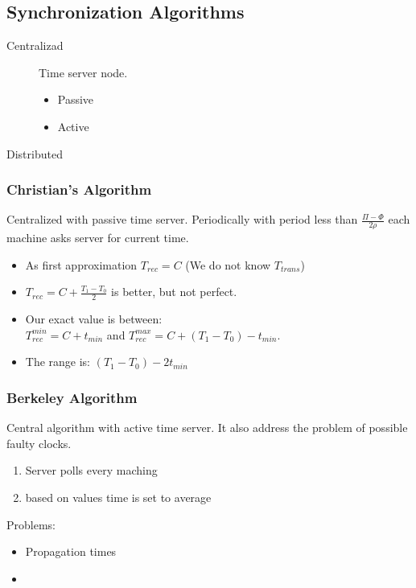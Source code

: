 \documentclass[a4paper]{article}
\begin{document}
\subsection{Synchronization Algorithms}
\begin{description}
		\item[Centralizad] Time server node.
				\begin{itemize}
						\item Passive
						\item Active
				\end{itemize}
		\item[Distributed]
\end{description}
\subsubsection{Christian's Algorithm}
Centralized with passive time server. Periodically with period less than
$\frac{\Pi - \Phi}{2\rho}$ each machine asks server for current time.
\begin{itemize}
		\item As first approximation $T_{rec}=C$ (We do not know $T_{trans}$)
		\item $T_{rec}=C+\frac{T_1-T_0}{2}$ is better, but not perfect.
		\item Our exact value is between: \\$T_{rec}^{min}=C+t_{min}$ and
				$T_{rec}^{max}=C+(T_1-T_0)-t_{min}$.
		\item The range is: $(T_1-T_0)-2t_{min}$
\end{itemize} 
\subsubsection{Berkeley Algorithm}
Central algorithm with active time server. It also address the problem of
possible faulty clocks.
\begin{enumerate}
		\item Server polls every maching
		\item based on values time is set to average
\end{enumerate}
Problems:
\begin{itemize}
		\item Propagation times
		\item 
\end{itemize}
\end{document}
